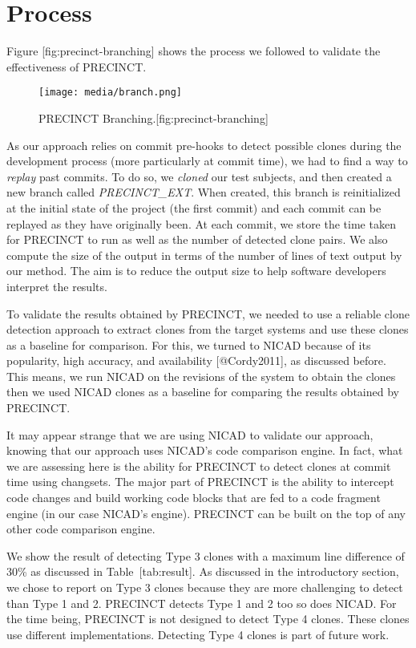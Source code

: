 \section{Process}\label{sub:Process}

Figure {[}fig:precinct-branching{]} shows the process we followed to
validate the effectiveness of PRECINCT.

\begin{figure}[htbp]
\centering
\texttt{[image: media/branch.png]}
\caption{PRECINCT Branching.{[}fig:precinct-branching{]}}
\end{figure}

As our approach relies on commit pre-hooks to detect possible clones
during the development process (more particularly at commit time), we
had to find a way to \emph{replay} past commits. To do so, we
\emph{cloned} our test subjects, and then created a new branch called
\emph{PRECINCT\_EXT}. When created, this branch is reinitialized at the
initial state of the project (the first commit) and each commit can be
replayed as they have originally been. At each commit, we store the time
taken for PRECINCT to run as well as the number of detected clone pairs.
We also compute the size of the output in terms of the number of lines
of text output by our method. The aim is to reduce the output size to
help software developers interpret the results.

To validate the results obtained by PRECINCT, we needed to use a
reliable clone detection approach to extract clones from the target
systems and use these clones as a baseline for comparison. For this, we
turned to NICAD because of its popularity, high accuracy, and
availability {[}@Cordy2011{]}, as discussed before. This means, we run
NICAD on the revisions of the system to obtain the clones then we used
NICAD clones as a baseline for comparing the results obtained by
PRECINCT.

It may appear strange that we are using NICAD to validate our approach,
knowing that our approach uses NICAD's code comparison engine. In fact,
what we are assessing here is the ability for PRECINCT to detect clones
at commit time using changsets. The major part of PRECINCT is the
ability to intercept code changes and build working code blocks that are
fed to a code fragment engine (in our case NICAD's engine). PRECINCT can
be built on the top of any other code comparison engine.

We show the result of detecting Type 3 clones with a maximum line
difference of 30\% as discussed in Table~{[}tab:result{]}. As discussed
in the introductory section, we chose to report on Type 3 clones because
they are more challenging to detect than Type 1 and 2. PRECINCT detects
Type 1 and 2 too so does NICAD. For the time being, PRECINCT is not
designed to detect Type 4 clones. These clones use different
implementations. Detecting Type 4 clones is part of future work.

